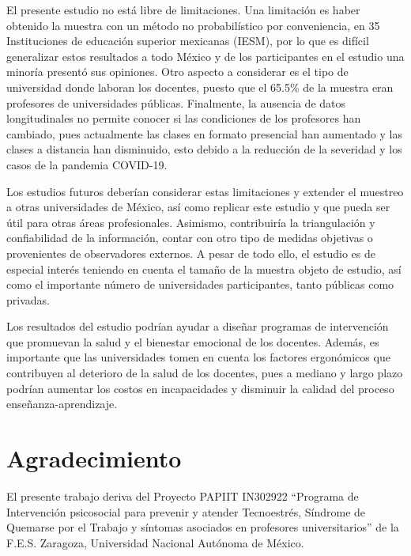 \documentclass[spanish]{textolivre}
\begin{document}
El presente estudio no está libre de limitaciones. Una limitación es haber obtenido la muestra con un método no probabilístico por conveniencia, en 35 Instituciones de educación superior mexicanas (IESM), por lo que es difícil generalizar estos resultados a todo México y de los participantes en el estudio una minoría presentó sus opiniones. Otro aspecto a considerar es el tipo de universidad donde laboran los docentes, puesto que el 65.5\% de la muestra eran profesores de universidades públicas. Finalmente, la ausencia de datos longitudinales no permite conocer si las condiciones de los profesores han cambiado, pues actualmente las clases en formato presencial han aumentado y las clases a distancia han disminuido, esto debido a la reducción de la severidad y los casos de la pandemia COVID-19.

Los estudios futuros deberían considerar estas limitaciones y extender el muestreo a otras universidades de México, así como replicar este estudio y que pueda ser útil para otras áreas profesionales. Asimismo, contribuiría la triangulación y confiabilidad de la información, contar con otro tipo de medidas objetivas o provenientes de observadores externos. A pesar de todo ello, el estudio es de especial interés teniendo en cuenta el tamaño de la muestra objeto de estudio, así como el importante número de universidades participantes, tanto públicas como privadas.

Los resultados del estudio podrían ayudar a diseñar programas de intervención que promuevan la salud y el bienestar emocional de los docentes. Además, es importante que las universidades tomen en cuenta los factores ergonómicos que contribuyen al deterioro de la salud de los docentes, pues a mediano y largo plazo podrían aumentar los costos en incapacidades y disminuir la calidad del proceso enseñanza-aprendizaje.

\section{Agradecimiento}
El presente trabajo deriva del Proyecto PAPIIT IN302922 “Programa de Intervención psicosocial para prevenir y atender Tecnoestrés, Síndrome de Quemarse por el Trabajo y síntomas asociados en profesores universitarios” de la F.E.S. Zaragoza, Universidad Nacional Autónoma de México.




\printbibliography\label{sec-bib}
\end{document}
